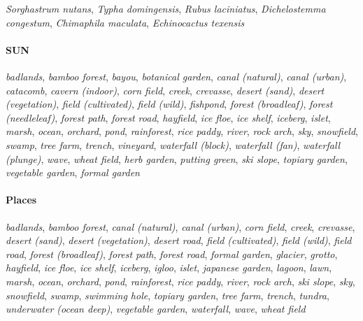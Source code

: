 \documentclass[final]{cvpr}
\begin{document}
\textit{Sorghastrum nutans}, \textit{Typha domingensis}, \textit{Rubus laciniatus}, \textit{Dichelostemma congestum}, \textit{Chimaphila maculata}, \textit{Echinocactus texensis}

\vspace{-0.4cm}

\paragraph{SUN} \textit{badlands}, \textit{bamboo forest}, \textit{bayou}, \textit{botanical garden}, \textit{canal (natural)}, \textit{canal (urban)}, \textit{catacomb}, \textit{cavern (indoor)}, \textit{corn field}, \textit{creek}, \textit{crevasse}, \textit{desert (sand)}, \textit{desert (vegetation)}, \textit{field (cultivated)}, \textit{field (wild)}, \textit{fishpond}, \textit{forest (broadleaf)}, \textit{forest (needleleaf)}, \textit{forest path}, \textit{forest road}, \textit{hayfield}, \textit{ice floe}, \textit{ice shelf}, \textit{iceberg}, \textit{islet}, \textit{marsh}, \textit{ocean}, \textit{orchard}, \textit{pond}, \textit{rainforest}, \textit{rice paddy}, \textit{river}, \textit{rock arch}, \textit{sky}, \textit{snowfield}, \textit{swamp}, \textit{tree farm}, \textit{trench}, \textit{vineyard}, \textit{waterfall (block)}, \textit{waterfall (fan)}, \textit{waterfall (plunge)}, \textit{wave}, \textit{wheat field}, \textit{herb garden}, \textit{putting green}, \textit{ski slope}, \textit{topiary garden}, \textit{vegetable garden}, \textit{formal garden}

\vspace{-0.4cm}

\paragraph{Places} \textit{badlands}, \textit{bamboo forest}, \textit{canal (natural)}, \textit{canal (urban)}, \textit{corn field}, \textit{creek}, \textit{crevasse}, \textit{desert (sand)}, \textit{desert (vegetation)}, \textit{desert road}, \textit{field (cultivated)}, \textit{field (wild)}, \textit{field road}, \textit{forest (broadleaf)}, \textit{forest path}, \textit{forest road}, \textit{formal garden}, \textit{glacier}, \textit{grotto}, \textit{hayfield}, \textit{ice floe}, \textit{ice shelf}, \textit{iceberg}, \textit{igloo}, \textit{islet}, \textit{japanese garden}, \textit{lagoon}, \textit{lawn}, \textit{marsh}, \textit{ocean}, \textit{orchard}, \textit{pond}, \textit{rainforest}, \textit{rice paddy}, \textit{river}, \textit{rock arch}, \textit{ski slope}, \textit{sky}, \textit{snowfield}, \textit{swamp}, \textit{swimming hole}, \textit{topiary garden}, \textit{tree farm}, \textit{trench}, \textit{tundra}, \textit{underwater (ocean deep)}, \textit{vegetable garden}, \textit{waterfall}, \textit{wave}, \textit{wheat field}
\end{document}
